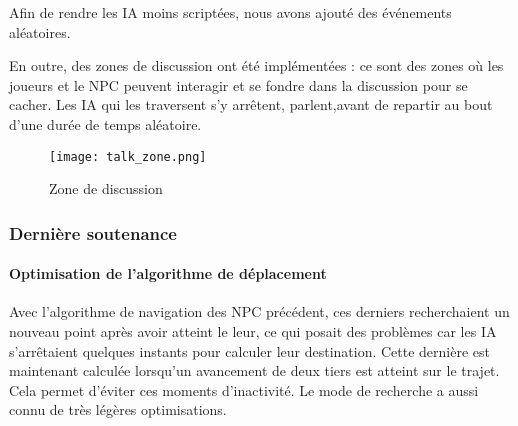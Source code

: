     
        Afin de rendre les IA moins scriptées, nous avons ajouté des événements aléatoires.
        
        En outre, des zones de discussion ont été implémentées : ce sont des zones où les joueurs et le NPC peuvent interagir 
        et se fondre dans la discussion pour se cacher. Les IA qui les traversent s'y arrêtent, parlent,avant de repartir au bout d'une durée 
        de temps aléatoire.

        \begin{figure}[hbt!]
            \centering
            \texttt{[image: talk\_zone.png]}
            \caption{Zone de discussion}
        \end{figure}



    \subsubsection{Dernière soutenance}

        \paragraph{Optimisation de l'algorithme de déplacement}

        Avec l'algorithme de navigation des NPC précédent, ces derniers recherchaient un nouveau point après avoir atteint 
        le leur, ce qui posait des problèmes car les IA s'arrêtaient quelques instants pour calculer leur destination. Cette dernière 
        est maintenant calculée lorsqu'un avancement de deux tiers est atteint sur le trajet. Cela permet d'éviter ces moments 
        d'inactivité. Le mode de recherche a aussi connu de très légères optimisations.